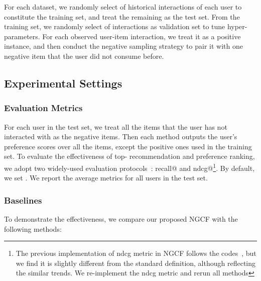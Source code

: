 \documentclass[sigconf]{acmart}
\theoremstyle{definition}
\begin{document}
For each dataset, we randomly select  of historical interactions of each user to constitute the training set, and treat the remaining as the test set.
From the training set, we randomly select  of interactions as validation set to tune hyper-parameters.
For each observed user-item interaction, we treat it as a positive instance, and then conduct the negative sampling strategy to pair it with one negative item that the user did not consume before.





\subsection{Experimental Settings}
\subsubsection{\textbf{Evaluation Metrics}}
For each user in the test set, we treat all the items that the user has not interacted with as the negative items.
Then each method outputs the user's preference scores over all the items, except the positive ones used in the training set.
To evaluate the effectiveness of top- recommendation and preference ranking, we adopt two widely-used evaluation protocols~\cite{NCF,HOP-rec}: recall@ and ndcg@\footnote{The previous implementation of ndcg metric in NGCF follows the codes~\cite{IRGAN}, but we find it is slightly different from the standard definition, although reflecting the similar trends. We re-implement the ndcg metric and rerun all methods}.
By default, we set .
We report the average metrics for all users in the test set.






\subsubsection{\textbf{Baselines}}
To demonstrate the effectiveness, we compare our proposed NGCF with the following methods:
\end{document}
